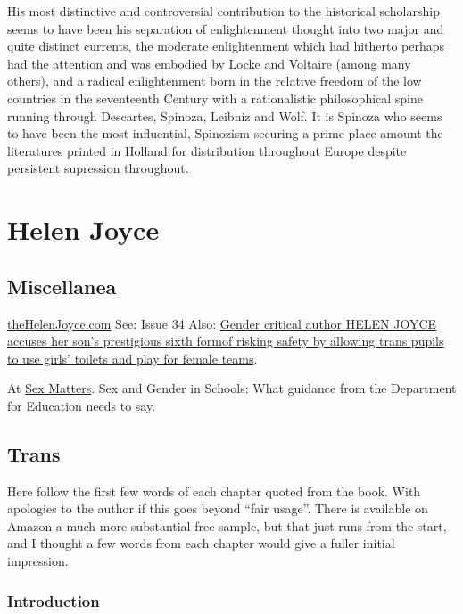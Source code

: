 \documentclass[10pt,titlepage]{book}
\begin{document}
His most distinctive and controversial contribution to the historical scholarship seems to have been his separation of enlightenment thought into two major and quite distinct currents, the moderate enlightenment which had hitherto perhaps had the attention and was embodied by Locke and Voltaire (among many others), and a radical enlightenment born in the relative freedom of the low countries in the seventeenth Century with a rationalistic philosophical spine running through Descartes, Spinoza, Leibniz and Wolf.
It is Spinoza who seems to have been the most influential, Spinozism securing a prime place amount the literatures printed in Holland for distribution throughout Europe despite persistent supression throughout.


\section{Helen Joyce}\label{JoyceHelen}

\subsection{Miscellanea}

\href{https://www.thehelenjoyce.com}{theHelenJoyce.com}
See: Issue 34
Also: \href{https://www.dailymail.co.uk/femail/article-11693283/HELEN-JOYCE-explains-complain-sons-school-started.html?ref=helen-joyce}{Gender critical author HELEN JOYCE accuses her son's prestigious sixth formof risking safety by allowing trans pupils to use girls' toilets and play for female teams}.

At \href{https://sex-matters.org}{Sex Matters}.
Sex and Gender in Schools: What guidance from the Department for Education needs to say.

\subsection{Trans \cite{joyce2021}}
Here follow the first few words of each chapter quoted from the book.
With apologies to the author if this goes beyond ``fair usage''.
There is available on Amazon a much more substantial free sample, but that just runs from the start, and I thought a few words from each chapter would give a fuller initial impression.

\subsubsection{Introduction}
\end{document}
